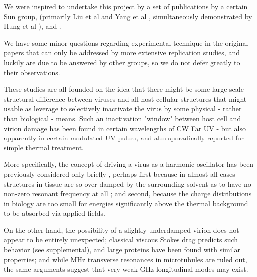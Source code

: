 \documentclass[paper.tex]{subfiles}
\begin{document}


We were inspired to undertake this project by a set of publications by a certain Sun group, (primarily Liu et al \cite{Microwave2009} and Yang et al \cite{Efficient2015}, simultaneously demonstrated by Hung et al \cite{focusing2014}), and \cite{Optical2020} \cite{Theoretical2020}.

We have some minor questions regarding experimental technique in the original papers that can only be addressed by more extensive replication studies, and luckily are due to be answered by other groups\cite{Generating}, so we do not defer greatly to their observations. 

These studies are all founded on the idea that there might be some large-scale structural difference between viruses and all host cellular structures that might usable as leverage to selectively inactivate the virus by some physical - rather than biological - means. Such an inactivation "window" between host cell and virion damage has been found in certain wavelengths of CW Far UV\cite{Germicidal2017} - but also apparently in certain modulated UV pulses\cite{Use1987a}\cite{Can1993}, and also sporadically reported for simple thermal treatment\cite{Summary}. 

More specifically, the concept of driving a virus as a harmonic oscillator has been previously considered only briefly \cite{MECHANICAL1968}\cite{Comment2004}, perhaps first because in almost all cases structures in tissue are so over-damped by the surrounding solvent\cite{Vibrational2002}\cite{Biological2002}\cite{Biophysics2000}\cite{Viscous2000} as to have no non-zero resonant frequency at all \cite{dielectric1996}\cite{gabriel1996compilation}; and second, because the charge distributions in biology are too small for energies significantly above the thermal background to be absorbed via applied fields. 

On the other hand, the possibility of a slightly underdamped virion does not appear to be entirely unexpected; classical viscous Stokes drag predicts such behavior\cite{nature1986} (see supplemental), and large proteins have been found with similar properties\cite{Microwave1994}; and while MHz transverse resonances in microtubules are ruled out\cite{Viscous2000}, the same arguments suggest that very weak GHz longitudinal modes may exist. 
\end{document}

